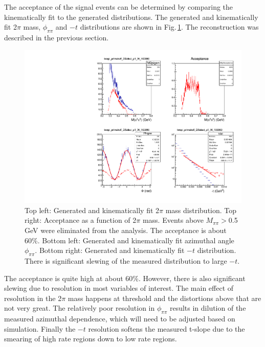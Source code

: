 The acceptance of the signal events can be determined by comparing the
kinematically fit to the generated distributions. The generated and
kinematically fit 2$\pi$ mass, $\phi_{\pi\pi}$ and $-t$ distributions
are shown in
Fig.\,\ref{fig:twopi_primakoff_DSelect_p1_W_100000_sum}. The
reconstruction was described in the previous section.
\begin{figure}[tph]
\centering
\includegraphics[width=6in]{figures/twopi_primakoff_DSelect_p1_W_100000_sum.pdf}
\caption{Top left: Generated and kinematically fit 2$\pi$ mass distribution. Top right: Acceptance as a function of 2$\pi$ mass. Events above $M_{\pi\pi}>$0.5 GeV were eliminated from the analysis. The acceptance is about 60\%. Bottom left: Generated and kinematically fit azimuthal angle $\phi_{\pi\pi}$. Bottom right: Generated and kinematically fit $-t$ distribution. There is significant slewing of the measured distribution to large $-t$.}
\label{fig:twopi_primakoff_DSelect_p1_W_100000_sum}
\end{figure}
The acceptance is quite high at about 60\%. However, there is also
significant slewing due to resolution in most variables of
interest. The main effect of resolution in the 2$\pi$ mass happens at
threshold and the distortions above that are not very great. The
relatively poor resolution in $\phi_{\pi\pi}$ results in dilution of
the measured azimuthal dependence, which will need to be adjusted
based on simulation. Finally the $-t$ resolution softens the measured
t-slope due to the smearing of high rate regions down to low rate
regions.
